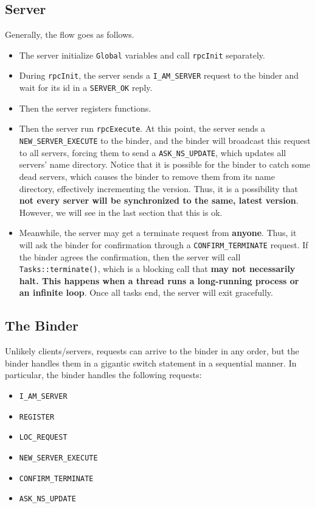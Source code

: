 \subsection{Server}
Generally, the flow goes as follows.
\begin{itemize}
\item
The server initialize {\tt Global} variables and call {\tt rpcInit} separately.
\item
During {\tt rpcInit}, the server sends a {\tt I\_AM\_SERVER} request to the binder and wait for its id in a {\tt SERVER\_OK} reply.
\item
Then the server registers functions.
\item
Then the server run {\tt rpcExecute}.
At this point, the server sends a {\tt NEW\_SERVER\_EXECUTE} to the binder, and the binder will broadcast this request to all servers, forcing them to send a {\tt ASK\_NS\_UPDATE}, which updates all servers' name directory.
Notice that it is possible for the binder to catch some dead servers, which causes the binder to remove them from its name directory, effectively incrementing the version.
Thus, it is a possibility that {\bf not every server will be synchronized to the same, latest version}.
However, we will see in the last section that this is ok.
\item
Meanwhile, the server may get a terminate request from {\bf anyone}.
Thus, it will ask the binder for confirmation through a {\tt CONFIRM\_TERMINATE} request.
If the binder agrees the confirmation, then the server will call {\tt Tasks::terminate()}, which is a blocking call that {\bf may not necessarily halt. This happens when a thread runs a long-running process or an infinite loop}.
Once all tasks end, the server will exit gracefully.
\end{itemize}

\subsection{The Binder}
Unlikely clients/servers, requests can arrive to the binder in any order, but the binder handles them in a gigantic switch statement in a sequential manner.
In particular, the binder handles the following requests:
\begin{itemize}
\item
{\tt I\_AM\_SERVER}
\item
{\tt REGISTER}
\item
{\tt LOC\_REQUEST}
\item
{\tt NEW\_SERVER\_EXECUTE}
\item
{\tt CONFIRM\_TERMINATE}
\item
{\tt ASK\_NS\_UPDATE}
\end{itemize}
